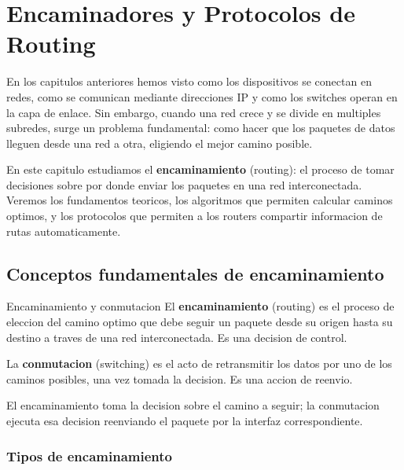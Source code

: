 
\chapter{Encaminadores y Protocolos de Routing}

En los capitulos anteriores hemos visto como los dispositivos se conectan en
redes, como se comunican mediante direcciones IP y como los switches operan
en la capa de enlace. Sin embargo, cuando una red crece y se divide en multiples
subredes, surge un problema fundamental: como hacer que los paquetes de datos
lleguen desde una red a otra, eligiendo el mejor camino posible.

En este capitulo estudiamos el \textbf{encaminamiento} (routing): el proceso de
tomar decisiones sobre por donde enviar los paquetes en una red interconectada.
Veremos los fundamentos teoricos, los algoritmos que permiten calcular caminos
optimos, y los protocolos que permiten a los routers compartir informacion de
rutas automaticamente.


\section{Conceptos fundamentales de encaminamiento}

\begin{definicion}{Encaminamiento y conmutacion}
El \textbf{encaminamiento} (routing) es el proceso de eleccion del camino optimo
que debe seguir un paquete desde su origen hasta su destino a traves de una
red interconectada. Es una decision de control.

La \textbf{conmutacion} (switching) es el acto de retransmitir los datos por uno de
los caminos posibles, una vez tomada la decision. Es una accion de reenvio.
\end{definicion}

El encaminamiento toma la decision sobre el camino a seguir; la conmutacion
ejecuta esa decision reenviando el paquete por la interfaz correspondiente.

\subsection{Tipos de encaminamiento}

